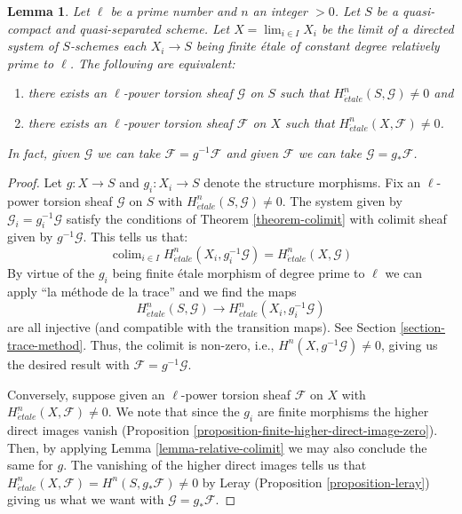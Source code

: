 \documentclass[10pt,a4paper]{amsart}
\theoremstyle{plain}
\newtheorem{lemma}[subsection]{Lemma}
\theoremstyle{definition}
\theoremstyle{remark}
\numberwithin{equation}{subsection}
\def\lim{\mathop{\mathrm{lim}}\nolimits}
\def\colim{\mathop{\mathrm{colim}}\nolimits}
\def\etale{{\acute{e}tale}}
\begin{document}
\begin{lemma}
\label{lemma-nonvanishing-inherited}
Let $\ell$ be a prime number and $n$ an integer $> 0$.
Let $S$ be a quasi-compact and quasi-separated scheme.
Let $X = \lim_{i \in I} X_i$ be the limit of a
directed system of $S$-schemes each $X_i \to S$
being finite \'etale of constant degree relatively prime to $\ell$.
The following are equivalent:
\begin{enumerate}
\item there exists an $\ell$-power torsion sheaf
$\mathcal{G}$ on $S$ such that $H_\etale^n(S, \mathcal{G}) \neq 0$ and
\item there exists an $\ell$-power torsion sheaf $\mathcal{F}$ on $X$
such that $H_\etale^n(X, \mathcal{F}) \neq 0$.
\end{enumerate}
In fact, given
$\mathcal{G}$ we can take $\mathcal{F} = g^{-1}\mathcal{F}$
and given
$\mathcal{F}$ we can take $\mathcal{G} = g_*\mathcal{F}$.
\end{lemma}

\begin{proof}
Let $g : X \to S$ and $g_i : X_i \to S$ denote the structure morphisms.
Fix an $\ell$-power torsion sheaf $\mathcal{G}$ on $S$
with $H^n_\etale(S, \mathcal{G}) \not = 0$.
The system given by $\mathcal{G}_i = g_i^{-1}\mathcal{G}$
satisfy the conditions of Theorem \ref{theorem-colimit}
with colimit sheaf given by $g^{-1}\mathcal{G}$. This tells 
us that:
$$
\colim_{i\in I} H^n_\etale(X_i, g_i^{-1}\mathcal{G}) =
H^n_\etale(X, \mathcal{G})
$$
By virtue of the $g_i$ being finite \'etale morphism of degree prime
to $\ell$ we can apply ``la m\'ethode de la trace'' and we find
the maps
$$
H^n_\etale(S, \mathcal{G}) \to H^n_\etale(X_i, g_i^{-1}\mathcal{G})
$$
are all injective (and compatible with the transition maps).
See Section \ref{section-trace-method}. Thus, the colimit is non-zero, i.e.,
$H^n(X,g^{-1}\mathcal{G}) \neq 0$, giving us the desired result with 
$\mathcal{F} = g^{-1}\mathcal{G}$.

\medskip\noindent
Conversely, suppose given an $\ell$-power torsion sheaf $\mathcal{F}$ on $X$
with $H^n_\etale(X, \mathcal{F}) \not = 0$. We note that since the $g_i$
are finite morphisms the higher direct images vanish
(Proposition \ref{proposition-finite-higher-direct-image-zero}).
Then, by applying Lemma \ref{lemma-relative-colimit}
we may also conclude the  same for $g$.
The vanishing of the higher direct images tells us that
$H^n_\etale(X, \mathcal{F}) = H^n(S, g_*\mathcal{F}) \neq 0$
by Leray (Proposition \ref{proposition-leray})
giving us what we want with $\mathcal{G} = g_*\mathcal{F}$.
\end{proof}
\end{document}
